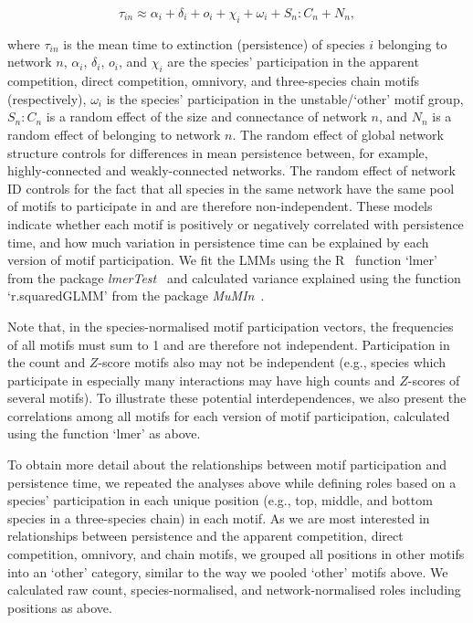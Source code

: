 \documentclass[12pt]{article}
\begin{document}
\begin{spacing}{2.0}
                \begin{equation}
                    \tau_{in} \approx \alpha_{i} + \delta_{i} + o_{i} + \chi_{i} + \omega_{i} + S_{n}:C_{n} +N_n,
                    \label{eq:persistence_motifs}
                \end{equation}

                where $\tau_{in}$ is the mean time to extinction (persistence) of species $i$ belonging to network $n$,  $\alpha_{i}$, $\delta_{i}$, $o_{i}$, and $\chi_{i}$ are the species' participation in the apparent competition, direct competition, omnivory, and three-species chain motifs (respectively), $\omega_{i}$ is the species' participation in the unstable/`other' motif group, $S_{n}:C_{n}$ is a random effect of the size and connectance of network $n$, and $N_n$ is a random effect of belonging to network $n$.
                The random effect of global network structure controls for differences in mean persistence between, for example, highly-connected and weakly-connected networks. 
                The random effect of network ID controls for the fact that all species in the same network have the same pool of motifs to participate in and are therefore non-independent.
                These models indicate whether each motif is positively or negatively correlated with persistence time, and how much variation in persistence time can be explained by each version of motif participation. 
                We fit the LMMs using the R~\citep{R} function `lmer' from the package \emph{lmerTest}~\citep{lmerTest} and calculated variance explained using the function `r.squaredGLMM' from the package \emph{MuMIn}~\citep{MuMIn}.
                
                
                Note that, in the species-normalised motif participation vectors, the frequencies of all motifs must sum to 1 and are therefore not independent. 
                Participation in the count and $Z$-score motifs also may not be independent (e.g., species which participate in especially many interactions may have high counts and $Z$-scores of several motifs).
                To illustrate these potential interdependences, we also present the correlations among all motifs for each version of motif participation, calculated using the function `lmer' as above.
                
                
                To obtain more detail about the relationships between motif participation and persistence time, we repeated the analyses above while defining roles based on a species' participation in each unique position (e.g., top, middle, and bottom species in a three-species chain) in each motif.
                As we are most interested in relationships between persistence and the apparent competition, direct competition, omnivory, and chain motifs, we grouped all  positions in other motifs into an `other' category, similar to the way we pooled `other' motifs above.
                We calculated raw count, species-normalised, and network-normalised roles including positions as above.
                


\end{spacing}
\end{document}
